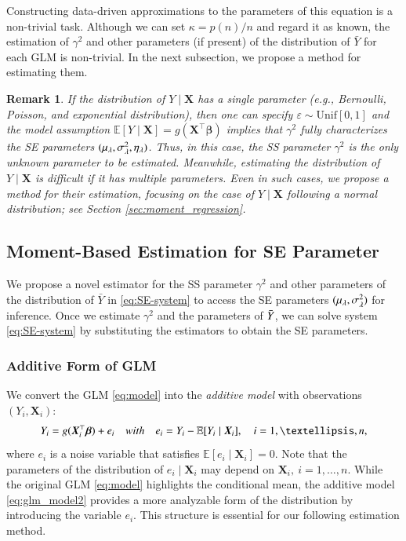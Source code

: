 \documentclass[12pt,reqno]{amsart}
\newtheorem{remark}{Remark}%
\newcommand{\E}{\mathbb{E}}
\newcommand{\bc}{\color{black}}
\newcommand{\cc}{\color{black}}
\newcommand{\ccc}{\color{black}}
\def\bX{\bm{X}}
\def\bbeta{\bm{\beta}}
\begin{document}
{\cc Constructing data-driven approximations to} the parameters of this equation is a non-trivial task.
Although we can set $\kappa=p(n)/n$ and regard it as known, the estimation of $\gamma^2$ and other parameters (if present) of the distribution of $\bar{Y}$ for each GLM is non-trivial. 
In the next subsection, we propose a method for estimating them.


\begin{remark}\label{remark:example}
    If the distribution of ${Y}\mid\bX$ has a single parameter (e.g., Bernoulli, Poisson, and exponential distribution), then 
    {\bc
    one can specify $\varepsilon\sim\mathrm{Unif}[0,1]$ and}
    the model assumption $\E[Y \mid \bX]=g(\bX^\top\bbeta)$ implies that $\gamma^2$ fully characterizes the SE parameters $(\mu_{\ccc\lambda},\sigma_{\lambda}^2,\eta_{\ccc\lambda})$. Thus, in this case, the SS parameter $\gamma^2$ is the only unknown parameter to be estimated. Meanwhile, estimating the distribution of ${Y}\mid\bX$ is difficult if it has multiple parameters. Even in such cases, we propose a method for their estimation, focusing on the case of ${Y}\mid\bX$ following a normal distribution; see Section \ref{sec:moment_regression}.
\end{remark}
 

\subsection{Moment-Based Estimation for SE Parameter} \label{sec:hyper_parameter_estimation}

We propose a novel estimator for the SS parameter $\gamma^2$ and other parameters of the distribution of $\bar{Y}$ in \eqref{eq:SE-system} to access the SE parameters $(\mu_{\ccc\lambda},\sigma_{\lambda}^2)$ for inference.
Once we estimate $\gamma^2$ and the parameters of $\Bar{Y}$, we can solve system \eqref{eq:SE-system} by substituting the estimators to obtain the SE parameters.


\subsubsection{Additive Form of GLM}

We convert the GLM \eqref{eq:model} into the \textit{additive model} with observations $(Y_i,\bX_i)$:
\begin{align}
    Y_i=g(\bX_i^\top\bbeta)+e_i\quad{\rm with}\quad e_i = Y_i - \mathbb{E}[Y_i \mid \bX_i],\quad i=1,\dots,n,\label{eq:glm_model2}
\end{align}
where $e_i$ is a noise variable that satisfies $\E[e_i\mid \bX_i]=0$.
Note that the parameters of the distribution of $e_i\mid\bX_i$ may depend on $\bX_i,~i=1,\dots,n$. 
While the original GLM \eqref{eq:model} highlights the conditional mean, the additive model \eqref{eq:glm_model2} provides a more analyzable form of the distribution by introducing the variable $e_i$. 
This structure is essential for our following estimation method. 
\end{document}
